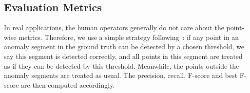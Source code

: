 



\subsection{Evaluation Metrics}
\label{subsec:evaluation_metrics}

In real applications, the human operators generally do not care about the point-wise metrics. Therefore, we use a simple strategy following~\cite{xu2018unsupervised}:
if any point in an anomaly segment in the ground truth can be detected by a chosen threshold, we say this segment is detected correctly, and all points in this segment
are treated as if they can be detected by this threshold. Meanwhile, the points outside the anomaly segments are treated as usual. The precision, recall, F-score and best F-score are then computed accordingly.


